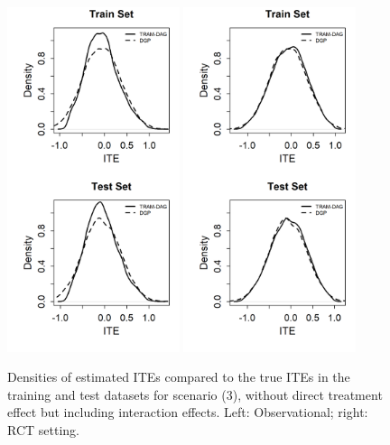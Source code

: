 \begin{figure}[htbp]
\centering
\includegraphics[width=0.45\textwidth]{img/results/observ_scenario3_ITE_densities_train_test.png}
\includegraphics[width=0.45\textwidth]{img/results/rct_scenario3_ITE_densities_train_test.png}
\caption{Densities of estimated ITEs compared to the true ITEs in the training and test datasets for scenario (3), without direct treatment effect but including interaction effects. Left: Observational; right: RCT setting.}
\label{fig:scenario3_ite_densities_train_test}
\end{figure}






